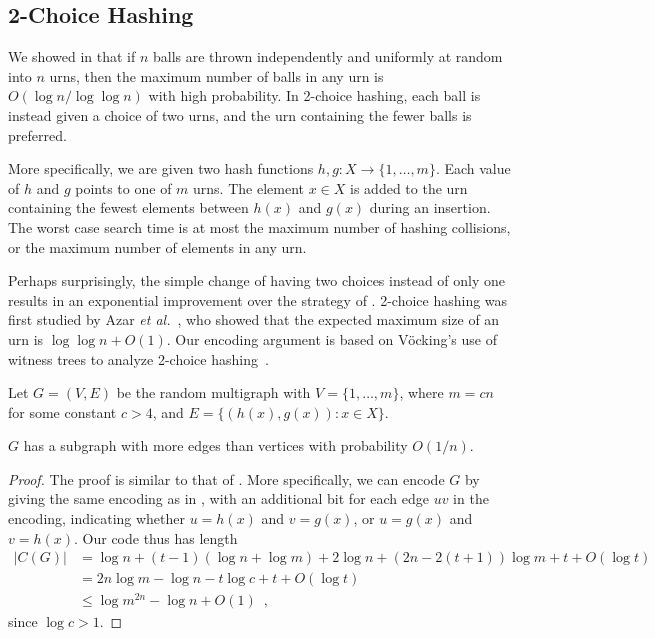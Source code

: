 \documentclass{patmorin}
\begin{document}
\subsection{2-Choice Hashing}

We showed in  that if $n$ balls are thrown independently
and uniformly at random into $n$ urns, then the maximum number of
balls in any urn is $O(\log n/\log \log n)$ with high probability. In
2-choice hashing, each ball is instead given a choice of two urns, and
the urn containing the fewer balls is preferred.

More specifically, we are given two hash functions
$h, g : X \to \{1, \ldots, m\}$. Each value of $h$ and $g$ points to
one of $m$ urns. The element $x \in X$ is added to the urn containing
the fewest elements between $h(x)$ and $g(x)$ during an insertion. The
worst case search time is at most the maximum number of hashing
collisions, or the maximum number of elements in any urn.

Perhaps surprisingly, the simple change of having two choices instead
of only one results in an exponential improvement over the strategy of
. 2-choice hashing was first studied by Azar \emph{et
  al.}~\cite{azar:multiplechoice}, who showed that the expected
maximum size of an urn is $\log \log n + O(1)$. Our encoding argument
is based on V\"{o}cking's use of witness trees to analyze 2-choice
hashing~\cite{vocking:witness}.

Let $G = (V, E)$ be the random multigraph with $V = \{1, \ldots, m\}$,
where $m = cn$ for some constant $c > 4$, and
$E = \{(h(x), g(x)) : x \in X\}$.

\begin{lem}
  $G$ has a subgraph with more edges than vertices with probability
  $O(1/n)$.
\end{lem}
\begin{proof}
  The proof is similar to that of . More
  specifically, we can encode $G$ by giving the same encoding as in
  , with an additional bit for each edge $uv$
  in the encoding, indicating whether $u = h(x)$ and $v = g(x)$, or $u
  = g(x)$ and $v = h(x)$. Our code thus has length
  \begin{align*}
    |C(G)| &= \log n + (t - 1)(\log n + \log m) + 2 \log n + (2n - 2(t + 1))\log m + t + O(\log t) \\
           &= 2n \log m - \log n - t \log c + t + O(\log t) \\
           &\le \log m^{2n} - \log n + O(1) \enspace ,
  \end{align*}
  since $\log c > 1$.
\end{proof}
\end{document}
